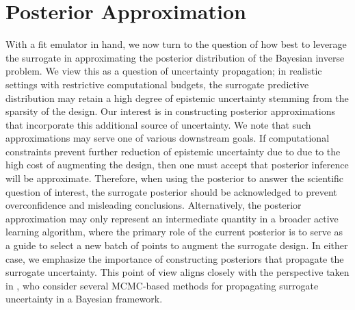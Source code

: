 \documentclass[12pt]{article}
\begin{document}
\section{Posterior Approximation} \label{sec:post_approx}
With a fit emulator in hand, we now turn to the question of how best to leverage the surrogate in approximating the 
posterior distribution of the Bayesian inverse problem. We view this as a question of uncertainty propagation; in realistic 
settings with restrictive computational budgets, the surrogate predictive distribution may retain a high degree of 
epistemic uncertainty stemming from the sparsity of the design. Our interest is in constructing posterior 
approximations that incorporate this additional source of uncertainty. We note that such approximations 
may serve one of various downstream goals. If computational constraints prevent further reduction of epistemic
uncertainty due to due to the high cost of augmenting the design, then one must accept that posterior inference 
will be approximate. Therefore, when using the posterior
to answer the scientific question of interest, the surrogate posterior should be acknowledged to prevent 
overconfidence and misleading conclusions. Alternatively, the posterior approximation may only 
represent an intermediate quantity in a broader active learning algorithm, where the primary role of the current 
posterior is to serve as a guide to select a new batch of points to augment the surrogate design. In either case, 
we emphasize the importance of constructing posteriors that propagate the surrogate uncertainty.
This point of view aligns closely with the perspective taken in \citep{BurknerSurrogate}, who consider several 
MCMC-based methods for propagating surrogate uncertainty in a Bayesian framework. 
\end{document}
